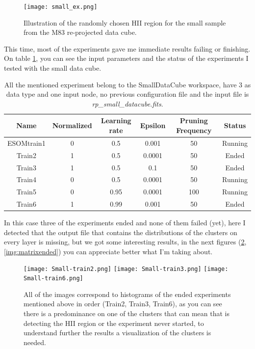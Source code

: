 \documentclass[11pt,fleqn]{book} %
\begin{document}
\begin{figure}[h!]
	\centering
    \texttt{[image: small\_ex.png]}
    \caption{Illustration of the randomly chosen HII region for the small sample from the M83 re-projected data cube.}
    \label{img:h2region}
\end{figure}

This time, most of the experiments gave me immediate results failing or finishing. On table \ref{tab:small}, you can see the input parameters and the status of the experiments I tested with the small data cube.

\begin{table}[h!]
  \centering
    \begin{tabular}{ c c c c c c }
    \hline\hline
    
    Name & Normalized & Learning rate & Epsilon & Pruning Frequency & Status\\
    \hline
    
    ESOMtrain1 & 0 & 0.5 & 0.001 & 50 & Running\\
    Train2 & 1 & 0.5 & 0.0001 & 50 & Ended\\
    Train3 & 1 & 0.5 & 0.1 & 50 & Ended\\
    Train4 & 0 & 0.5 & 0.0001 & 50 & Running\\
    Train5 & 0 & 0.95 & 0.0001 & 100 & Running\\
    Train6 & 1 & 0.99 & 0.001 & 50 & Ended\\

    \hline
  \end{tabular}
  \caption{All the mentioned experiment belong to the SmallDataCube workspace, have 3 as data type and one input node, no previous configuration file and the input file is \emph{rp\_small\_datacube.fits}.}
  \label{tab:small}
\end{table}
In this case three of the experiments ended and none of them failed (yet), here I detected that the output file that contains the distributions of the clusters on every layer is missing, but we got some interesting results, in the next figures (\ref{img:smallended},\ref{img:matrixended}) you can appreciate better what I'm taking about.

\begin{figure}[h!]
	\centering
    \texttt{[image: Small-train2.png]}
    \texttt{[image: Small-train3.png]}
    \texttt{[image: Small-train6.png]}
    \caption{All of the images correspond to histograms of the ended experiments mentioned above in order (Train2, Train3, Train6), as you can see there is a predominance on one of the clusters that can mean that is detecting the HII region or the experiment never started, to understand further the results a visualization of the clusters is needed.}
    \label{img:smallended}
\end{figure}
\end{document}
